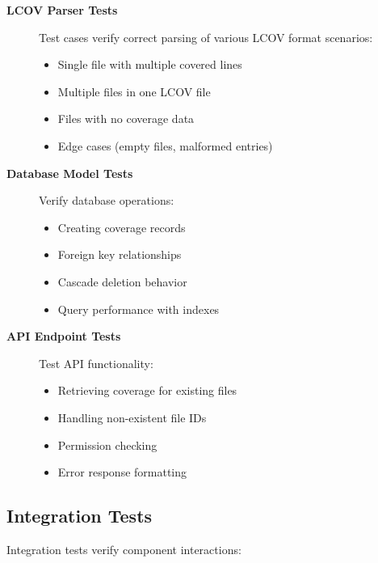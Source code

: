 \begin{description}
    \item[\textbf{LCOV Parser Tests}] Test cases verify correct parsing of various LCOV format scenarios:
    \begin{itemize}
        \item Single file with multiple covered lines
        \item Multiple files in one LCOV file
        \item Files with no coverage data
        \item Edge cases (empty files, malformed entries)
    \end{itemize}
    
    \item[\textbf{Database Model Tests}] Verify database operations:
    \begin{itemize}
        \item Creating coverage records
        \item Foreign key relationships
        \item Cascade deletion behavior
        \item Query performance with indexes
    \end{itemize}
    
    \item[\textbf{API Endpoint Tests}] Test API functionality:
    \begin{itemize}
        \item Retrieving coverage for existing files
        \item Handling non-existent file IDs
        \item Permission checking
        \item Error response formatting
    \end{itemize}
\end{description}

\subsection{Integration Tests}

Integration tests verify component interactions:

